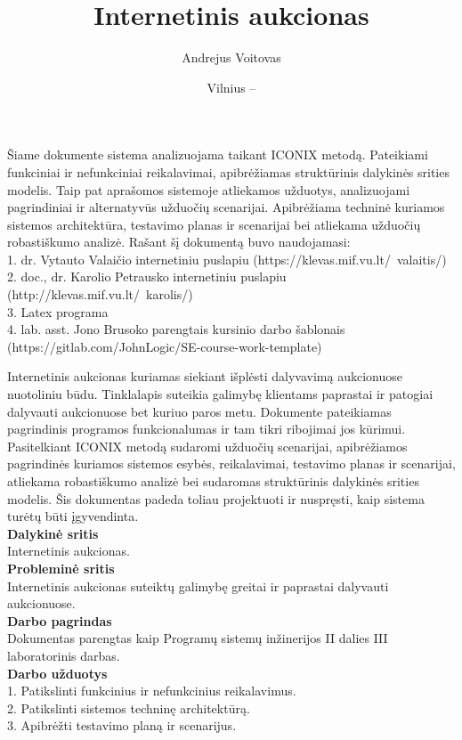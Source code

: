 \documentclass{VUMIFPSkursinis}
\title{Internetinis aukcionas}
\author{Andrejus Voitovas}
\date{Vilnius – \the\year}
\begin{document}
	\maketitle
	\cleardoublepage{}
	\setcounter{page}{2}
	Šiame dokumente sistema analizuojama taikant ICONIX metodą. Pateikiami funkciniai ir nefunkciniai reikalavimai, apibrėžiamas struktūrinis dalykinės srities modelis. Taip pat aprašomos sistemoje atliekamos užduotys, analizuojami pagrindiniai ir alternatyvūs užduočių scenarijai. Apibrėžiama
	techninė kuriamos sistemos architektūra, testavimo planas ir scenarijai bei atliekama užduočių robastiškumo analizė. Rašant šį dokumentą buvo naudojamasi:
	\\1. dr. Vytauto Valaičio internetiniu puslapiu (https://klevas.mif.vu.lt/~valaitis/)
	\\2. doc., dr. Karolio Petrausko internetiniu puslapiu (http://klevas.mif.vu.lt/~karolis/)
	\\3. Latex programa
	\\4. lab. asst. Jono Brusoko parengtais kursinio darbo šablonais (https://gitlab.com/JohnLogic/SE-course-work-template)
	\newpage
	\tableofcontents

	Internetinis aukcionas kuriamas siekiant išplėsti dalyvavimą aukcionuose nuotoliniu
	būdu. Tinklalapis suteikia galimybę klientams paprastai ir patogiai dalyvauti aukcionuose bet kuriuo paros metu. Dokumente pateikiamas pagrindinis programos funkcionalumas ir tam tikri ribojimai jos kūrimui. Pasitelkiant ICONIX metodą sudaromi užduočių scenarijai, apibrėžiamos pagrindinės kuriamos sistemos esybės, reikalavimai, testavimo planas ir scenarijai, atliekama robastiškumo analizė bei sudaromas struktūrinis dalykinės srities modelis. Šis dokumentas padeda toliau projektuoti ir nuspręsti, kaip sistema turėtų būti įgyvendinta.
	\\\textbf{Dalykinė sritis}
	\\Internetinis aukcionas.
	\\\textbf{Probleminė sritis}
	\\Internetinis aukcionas suteiktų galimybę greitai ir paprastai dalyvauti aukcionuose.
	\\\textbf{Darbo pagrindas}
	\\Dokumentas parengtas kaip Programų sistemų inžinerijos II dalies III laboratorinis darbas.
	\\\textbf{Darbo užduotys}
	\\1. Patikslinti funkcinius ir nefunkcinius reikalavimus.
	\\2. Patikslinti sistemos techninę architektūrą.
	\\3. Apibrėžti testavimo planą ir scenarijus.
	\newpage
\end{document}
